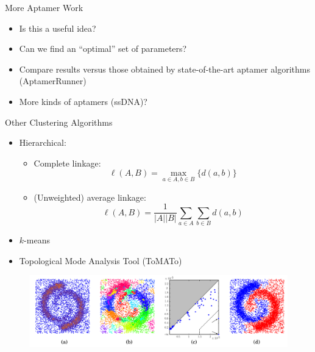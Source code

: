 \documentclass{beamer}
\begin{document}
\begin{frame}
  \printbibliography
\end{frame}

\begin{frame}{More Aptamer Work}
    \begin{itemize}
      \item Is this a useful idea?
      \item Can we find an ``optimal'' set of parameters?
      \item Compare results versus those obtained by state-of-the-art aptamer algorithms (AptamerRunner)
      \item More kinds of aptamers (ssDNA)?
    \end{itemize}
  \end{frame}
  
  \begin{frame}{Other Clustering Algorithms}
    \begin{itemize}
      \item Hierarchical:
      \begin{itemize}
        \item Complete linkage: $$\ell(A, B) = \max_{a\in A, b\in B}\{d(a,b)\}$$
        \item (Unweighted) average linkage: $$\ell(A,B) = \frac{1}{|A||B|}\sum_{a\in A}\sum_{b\in B}d(a,b)$$
      \end{itemize}
      \item $k$-means
      \item Topological Mode Analysis Tool (ToMATo) \cite{tomato}
  
    \end{itemize}
    \begin{figure}
      \begin{center}
        \includegraphics[width=1\textwidth]{tdaclusters.png}
      \end{center}
    \end{figure}
  \end{frame}
\end{document}
